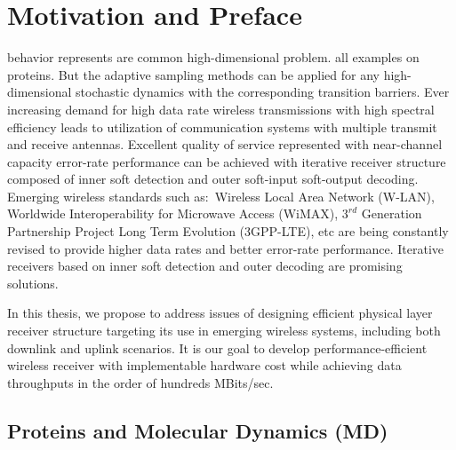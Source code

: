 \chapter{Motivation and Preface}
\label{ch:Intro}
behavior represents are common high-dimensional problem. all examples on proteins. But the adaptive sampling methods can be applied for any high-dimensional stochastic dynamics with the corresponding transition barriers.
Ever increasing demand for high data rate wireless transmissions with high spectral efficiency leads to utilization of communication systems with multiple transmit and receive antennas. Excellent quality of service represented with near-channel capacity error-rate performance can be achieved with iterative receiver structure composed of inner soft detection and outer soft-input soft-output decoding. Emerging wireless standards such as:~Wireless Local Area Network (W-LAN), Worldwide Interoperability for Microwave Access (WiMAX), $3^{rd}$ Generation Partnership Project Long Term Evolution (3GPP-LTE), etc are being constantly revised to provide higher data rates and better error-rate performance. Iterative receivers based on inner soft detection and outer decoding are promising solutions.

In this thesis, we propose to address issues of designing efficient physical layer receiver structure targeting its use in emerging wireless systems, including both downlink and uplink scenarios. It is our goal to develop performance-efficient wireless receiver with implementable hardware cost while achieving data throughputs in the order of hundreds MBits/sec. 


\section{Proteins and Molecular Dynamics (MD)}
\label{sec:MD}


